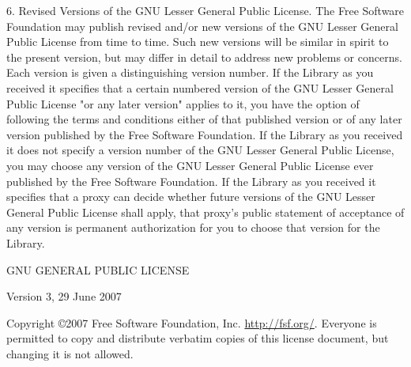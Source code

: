 \documentclass {scrbook}
\begin{document}
\begin{tiny}
6. Revised Versions of the GNU Lesser General Public License. The Free Software Foundation may publish revised and/or new versions of the GNU Lesser General Public License from time to time. Such new versions will be similar in spirit to the present version, but may differ in detail to address new problems or concerns. Each version is given a distinguishing version number. If the Library as you received it specifies that a certain numbered version of the GNU Lesser General Public License "or any later version" applies to it, you have the option of following the terms and conditions either of that published version or of any later version published by the Free Software Foundation. If the Library as you received it does not specify a version number of the GNU Lesser General Public License, you may choose any version of the GNU Lesser General Public License ever published by the Free Software Foundation. If the Library as you received it specifies that a proxy can decide whether future versions of the GNU Lesser General Public License shall apply, that proxy's public statement of acceptance of any version is permanent authorization for you to choose that version for the Library.

\begin{center}
GNU GENERAL PUBLIC LICENSE

Version 3, 29 June 2007
\end{center}

Copyright \copyright 2007 Free Software Foundation, Inc. \url{http://fsf.org/}. Everyone is permitted to copy and distribute verbatim copies of this license document, but changing it is not allowed.


\end{tiny}
\end{document}
